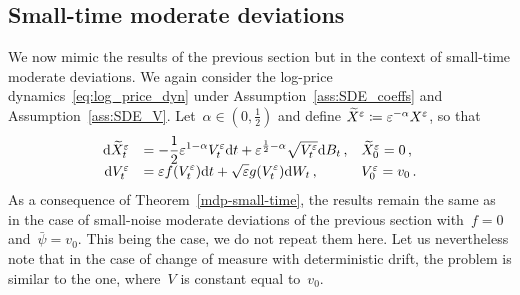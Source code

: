 


\subsection{Small-time moderate deviations}
We now mimic the results of the previous section but in the context of small-time moderate deviations. We again consider the log-price dynamics~\eqref{eq:log_price_dyn} under  Assumption~\ref{ass:SDE_coeffs} and Assumption~\ref{ass:SDE_V}.
Let~$\alpha \in (0,\frac{1}{2})$ and define 
${\widetilde{X}^\varepsilon \coloneqq \varepsilon^{-\alpha} X^{\varepsilon}}$, so that
\begin{equation*}
\begin{array}{rll}
\mathrm{d}\widetilde{X}^\varepsilon_t
&= \displaystyle -\frac{1}{2}\varepsilon^{1-\alpha} V_t^{\varepsilon} \mathrm{d} t + \varepsilon^{\frac{1}{2}-\alpha}\sqrt{V_t^\varepsilon}\mathrm{d} B_t\,, 
& \widetilde{X}_0^\varepsilon = 0\,, \\
\mathrm{d} V_t^\varepsilon &= \displaystyle\varepsilon f(V_t^\varepsilon)\mathrm{d} t + \sqrt{\varepsilon}g(V_t^\varepsilon)\mathrm{d} W_t\,,  & V_0^\varepsilon = v_0\,.
\end{array}
\end{equation*}
As a consequence of Theorem~\ref{mdp-small-time}, the results remain the same as in the case of small-noise moderate deviations of the previous section with~$f = 0$ and~$\bar\psi = v_0$. This being the case, we do not repeat them here. Let us nevertheless note that in the case of change of measure with deterministic drift, the problem is similar to the one, where~$V$ is constant equal to~$v_0$.
